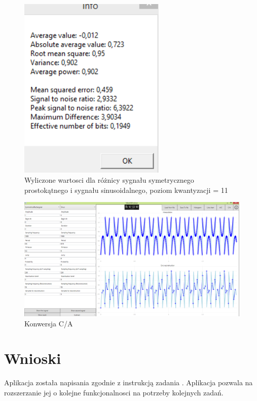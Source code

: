 \documentclass[12pt]{article}
\begin{document}
\begin{figure}[H]
 \centering
 \includegraphics[width=7cm]{images/addacinfo1.PNG}
 \vspace{-0.3cm}
 \caption{Wyliczone wartosci dla różnicy sygnału symetrycznego prostokątnego i sygnału sinusoidalnego, poziom kwantyzacji = 11}
 \label{gui}
\end{figure}

\begin{figure}[H]
 \centering
 \includegraphics[width=14cm]{images/addca.PNG}
 \vspace{-0.3cm}
 \caption{Konwersja C/A}
 \label{gui}
\end{figure}






\newpage

\section{Wnioski}

Aplikacja została napisania zgodnie z instrukcją zadania \cite{zad}. Aplikacja pozwala na rozszerzanie jej o kolejne funkcjonalnosci na potrzeby kolejnych zadań. 
\end{document}
